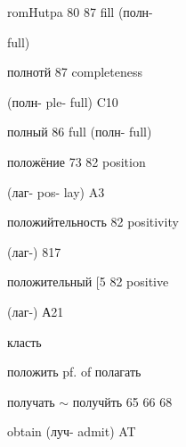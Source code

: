 \begin{minipage}[t]{0.475\textwidth}
\noindent *romHutpa 80 87 fill (полн-\par
\noindent full)\par
\noindent полнотй 87 completeness\par
\noindent (полн- ple- full) C10\par
\noindent полный 86 full (полн- full)\par
\noindent положёние 73 82 position\par
\noindent (лаг- pos- lay) A3\par
\noindent положийтельность 82 positivity\par
\noindent (лаг-) 817\par
\noindent положительный [5 82 positive\par
\noindent (лаг-) А21\par
\noindent класть\par
\noindent положить pf. of полагать\par
\noindent получать $\sim$ получйть 65 66 68\par
{} obtain (луч- admit) AT\par
\end{minipage}\hfill
